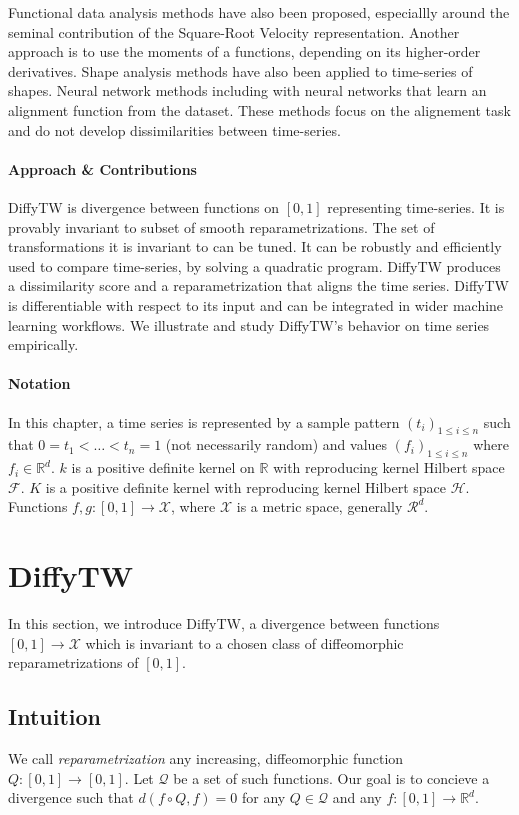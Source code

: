 Functional data analysis methods have also been proposed, especiallly around the seminal contribution of the Square-Root Velocity representation\citep{srvf}. Another approach is to use the moments of a functions, depending on its higher-order derivatives\citep{0712.1425}. Shape analysis methods have also been applied to time-series of shapes\citep{2108.05634,hal-00813825}. Neural network methods including with neural networks that learn an alignment function from the dataset\citep{2106.11911,dtan,2206.08107}. These methods focus on the alignement task and do not develop dissimilarities between time-series.

\paragraph{Approach \& Contributions}
DiffyTW is divergence between functions on $[0,1]$ representing time-series. It is provably invariant to subset of smooth reparametrizations. The set of transformations it is invariant to can be tuned. It can be robustly and efficiently used to compare time-series, by solving a quadratic program. DiffyTW produces a dissimilarity score and a reparametrization that aligns the time series. DiffyTW is differentiable with respect to its input and can be integrated in wider machine learning workflows. We illustrate and study DiffyTW's behavior on time series empirically.

\paragraph{Notation} In this chapter, a time series is represented by a sample pattern $(t_i)_{1 \leq i \leq n}$ such that $0 = t_1 < \ldots < t_n = 1$ (not necessarily random) and values $(f_i)_{1\leq i\leq n}$ where $f_i \in\mathbb R^d$. $k$ is a positive definite kernel on $\mathbb R$ with reproducing kernel Hilbert space $\mathcal F$. $K$ is a positive definite kernel with reproducing kernel Hilbert space $\mathcal H$. Functions $f,g:[0,1] \to \mathcal X$, where $\mathcal X$ is a metric space, generally $\mathcal R^d$.

\section{DiffyTW}
In this section, we introduce DiffyTW, a divergence between functions $[0,1] \to \mathcal X$ which is invariant to a chosen class of diffeomorphic reparametrizations of $[0,1]$.

\subsection{Intuition}\label{sec:diffytw-intuition}
We call \emph{reparametrization} any increasing, diffeomorphic function $Q:[0,1] \to [0,1]$. Let $\mathcal Q$ be a set of such functions. Our goal is to concieve a divergence such that $d(f\circ Q, f) = 0$ for any $Q\in\mathcal Q$ and any $f:[0,1] \to \mathbb R^d$.

